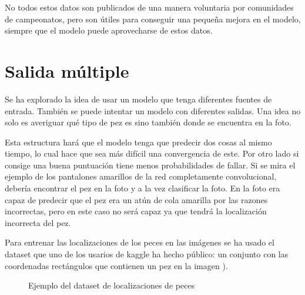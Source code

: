 No todos estos datos son publicados de una manera voluntaria por comunidades de campeonatos, pero son útiles para conseguir una pequeña mejora en el modelo, siempre que el modelo puede aprovecharse de estos datos.

\section{Salida múltiple}

Se ha explorado la idea de usar un modelo que tenga diferentes fuentes de entrada. También se puede intentar un modelo con diferentes salidas. Una idea no solo es averiguar qué tipo de pez es sino también donde se encuentra en la foto.

Esta estructura hará que el modelo tenga que predecir dos cosas al mismo tiempo, lo cual hace que sea más difícil una convergencia de este. Por otro lado si consige una buena puntuación tiene menos probabilidades de fallar. Si se mira el ejemplo de los pantalones amarillos de la red completamente convolucional, debería encontrar el pez en la foto y a la vez clasificar la foto. En la foto era capaz de predecir que el pez era un atún de cola amarilla por las razones incorrectas, pero en este caso no será capaz ya que tendrá la localización incorrecta del pez.

Para entrenar las localizaciones de los peces en las imágenes se ha usado el dataset que uno de los usarios de kaggle ha hecho público: un conjunto con las coordenadas rectángulos que contienen un pez en la imagen ).
\begin{figure}
  \caption{Ejemplo del dataset de localizaciones de peces}
\label{box}
\end{figure}

